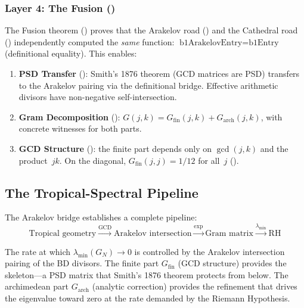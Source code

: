\subsubsection*{Layer 4: The Fusion ()}

The Fusion theorem () proves that the
Arakelov road () and the Cathedral road
() independently computed the \emph{same}
function: $\text{b1ArakelovEntry} = \text{b1Entry}$ (definitional equality).
This enables:
\begin{enumerate}
  \item \textbf{PSD Transfer} ():
    Smith's 1876 theorem (GCD matrices are PSD) transfers to the
    Arakelov pairing via the definitional bridge. Effective arithmetic
    divisors have non-negative self-intersection.

  \item \textbf{Gram Decomposition} ():
    $G(j,k) = G_{\mathrm{fin}}(j,k) + G_{\mathrm{arch}}(j,k)$,
    with concrete witnesses for both parts.

  \item \textbf{GCD Structure} ():
    the finite part depends only on $\gcd(j,k)$ and the product~$jk$.
    On the diagonal, $G_{\mathrm{fin}}(j,j) = 1/12$ for all~$j$
    ().
\end{enumerate}

\subsection{The Tropical-Spectral Pipeline}

The Arakelov bridge establishes a complete pipeline:
\[
  \text{Tropical geometry}
  \xrightarrow{\text{GCD}}
  \text{Arakelov intersection}
  \xrightarrow{\exp}
  \text{Gram matrix}
  \xrightarrow{\lambda_{\min}}
  \text{RH}
\]

\begin{principle}
The rate at which $\lambda_{\min}(G_N) \to 0$ is controlled by
the Arakelov intersection pairing of the BD divisors. The finite
part $G_{\mathrm{fin}}$ (GCD structure) provides the skeleton---a
PSD matrix that Smith's 1876 theorem protects from below. The
archimedean part $G_{\mathrm{arch}}$ (analytic correction) provides
the refinement that drives the eigenvalue toward zero at the rate
demanded by the Riemann Hypothesis.
\end{principle}

